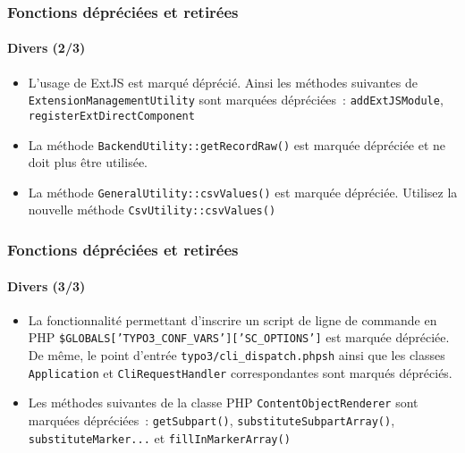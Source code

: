 \begin{frame}[fragile]
	\frametitle{Fonctions dépréciées et retirées}
	\framesubtitle{Divers (2/3)}

	\begin{itemize}

		\item L'usage de ExtJS est marqué déprécié. Ainsi les méthodes suivantes de
			\texttt{ExtensionManagementUtility} sont marquées dépréciées~:
			\texttt{addExtJSModule}, \texttt{registerExtDirectComponent}

		\item La méthode \texttt{BackendUtility::getRecordRaw()} est marquée dépréciée et ne doit plus être utilisée.

		\item La méthode \texttt{GeneralUtility::csvValues()} est marquée dépréciée.
			Utilisez la nouvelle méthode \texttt{CsvUtility::csvValues()}

	\end{itemize}

\end{frame}



\begin{frame}[fragile]
	\frametitle{Fonctions dépréciées et retirées}
	\framesubtitle{Divers (3/3)}

	\begin{itemize}
		\item La fonctionnalité permettant d'inscrire un script de ligne de commande en PHP
			\texttt{\$GLOBALS['TYPO3\_CONF\_VARS']['SC\_OPTIONS']\newline['GLOBAL']['cliKeys']['my\_extension']}
			est marquée dépréciée.
			De même, le point d'entrée \texttt{typo3/cli\_dispatch.phpsh} ainsi que les classes \texttt{Application}
			et \texttt{CliRequestHandler} correspondantes sont marqués dépréciés.

		\item Les méthodes suivantes de la classe PHP \texttt{ContentObjectRenderer} sont marquées dépréciées~:
			\texttt{getSubpart()}, \texttt{substituteSubpartArray()},
			\texttt{substituteMarker...} et \texttt{fillInMarkerArray()}

	\end{itemize}

\end{frame}

